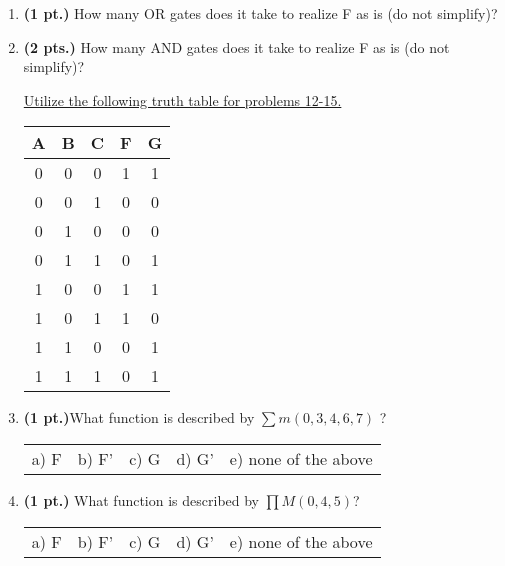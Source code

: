 \documentclass{article}
\begin{document}
\begin{enumerate}
\item {\bf (1 pt.)} How many OR gates does it take to realize F
as is (do not simplify)?

\item {\bf (2 pts.)} How many AND gates does it take to realize F 
as is (do not simplify)?

\pagebreak
\underline{Utilize the following truth table for problems 12-15.}

\begin{tabular}{c|c|c||c|c}
A & B & C & F & G \\ \hline \hline
0 & 0 & 0 & 1 & 1 \\ \hline
0 & 0 & 1 & 0 & 0 \\ \hline
0 & 1 & 0 & 0 & 0 \\ \hline
0 & 1 & 1 & 0 & 1 \\ \hline
1 & 0 & 0 & 1 & 1 \\ \hline
1 & 0 & 1 & 1 & 0 \\ \hline
1 & 1 & 0 & 0 & 1 \\ \hline
1 & 1 & 1 & 0 & 1 \\
\end{tabular} 


\item {\bf (1 pt.)}What function is described by $\sum m(0,3,4,6,7)$ ?

\begin{tabular}{p{0.7in} p{0.7in} p{0.7in} p{0.7in} l}
a) F & b) F' & c) G & d) G' & e) none of the above
\end{tabular}

\item {\bf (1 pt.)} What function is described by $\prod M(0,4,5)$?

\begin{tabular}{p{0.7in} p{0.7in} p{0.7in} p{0.7in} l}
a) F & b) F' & c) G & d) G' & e) none of the above
\end{tabular}



\end{enumerate}
\end{document}
